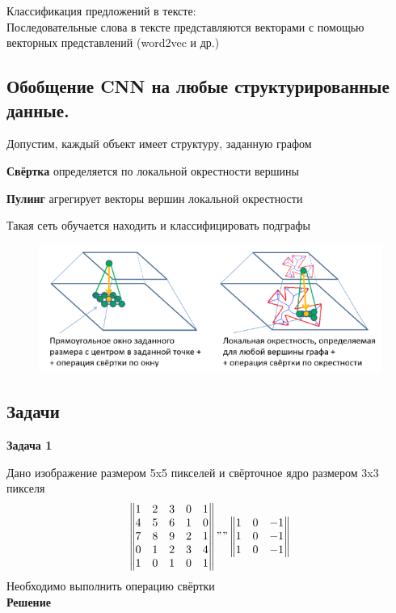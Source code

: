\begin{description}
\begin{figure}[h]
\label{fig:voice_signals_nn}

\end{figure}

Классификация предложений в тексте:\\
Последовательные слова в тексте представляются векторами с помощью векторных представлений (word2vec и др.)\\

\newpage
\subsection{Обобщение CNN на любые структурированные данные.}
Допустим, каждый объект имеет структуру, заданную графом

\textbf{Свёртка} определяется по локальной окрестности вершины

\textbf{Пулинг} агрегирует векторы вершин локальной окрестности

Такая сеть обучается находить и классифицировать подграфы

\begin{figure}[h]

\centering

\includegraphics[width=0.8\linewidth]{chapters/neural/images/обобщениеCNN.png}

\label{fig:cnn_generalization}

\end{figure}

\subsection{Задачи}
\textbf{Задача 1}

Дано изображение размером 5x5 пикселей и свёрточное ядро размером 3x3 пикселя\\

\begin{equation*}
\begin{Vmatrix}
1 & 2 & 3 & 0 & 1\\
4 & 5 & 6 & 1 & 0\\
7 & 8 & 9 & 2 & 1\\
0 & 1 & 2 & 3 & 4\\
1 & 0 & 1 & 0 & 1
\end{Vmatrix}
""
\begin{Vmatrix}
1 & 0 & -1\\
1 & 0 & -1\\
1 & 0 & -1
\end{Vmatrix}
\end{equation*}
Необходимо выполнить операцию свёртки\\
\textbf{Решение}


\end{description}

